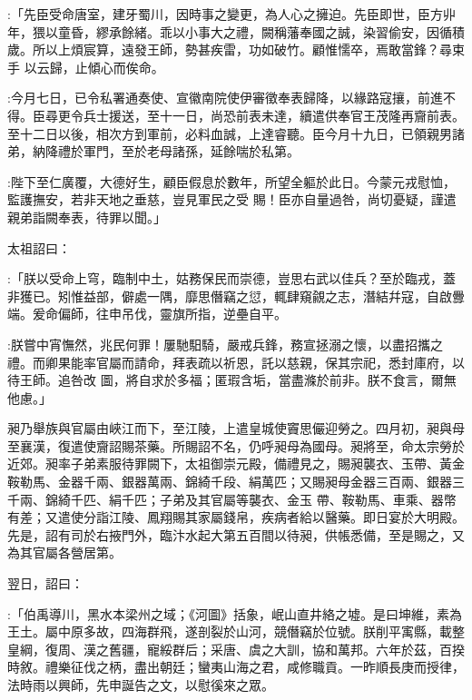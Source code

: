 \begin{pinyinscope}
 :「先臣受命唐室，建牙蜀川，因時事之變更，為人心之擁迫。先臣即世，臣方丱年，猥以童昏，繆承餘緒。乖以小事大之禮，闕稱藩奉國之誠，染習偷安，因循積歲。所以上煩宸算，遠發王師，勢甚疾雷，功如破竹。顧惟懦卒，焉敢當鋒？尋束手
 以云歸，止傾心而俟命。



 :今月七日，已令私署通奏使、宣徽南院使伊審徵奉表歸降，以緣路寇攘，前進不得。臣尋更令兵士援送，至十一日，尚恐前表未達，續遣供奉官王茂隆再齎前表。至十二日以後，相次方到軍前，必料血誠，上達睿聽。臣今月十九日，已領親男諸弟，納降禮於軍門，至於老母諸孫，延餘喘於私第。



 :陛下至仁廣覆，大德好生，顧臣假息於數年，所望全軀於此日。今蒙元戎慰恤，監護撫安，若非天地之垂慈，豈見軍民之受
 賜！臣亦自量過咎，尚切憂疑，謹遣親弟詣闕奉表，待罪以聞。」



 太祖詔曰：



 :「朕以受命上穹，臨制中土，姑務保民而崇德，豈思右武以佳兵？至於臨戎，蓋非獲已。矧惟益部，僻處一隅，靡思僭竊之愆，輒肆窺覦之志，潛結幷寇，自啟釁端。爰命偏師，往申吊伐，靈旗所指，逆壘自平。



 :朕嘗中宵憮然，兆民何罪！屢馳馹騎，嚴戒兵鋒，務宣拯溺之懷，以盡招攜之禮。而卿果能率官屬而請命，拜表疏以祈恩，託以慈親，保其宗祀，悉封庫府，以待王師。追咎改
 圖，將自求於多福；匿瑕含垢，當盡滌於前非。朕不食言，爾無他慮。」



 昶乃舉族與官屬由峽江而下，至江陵，上遣皇城使竇思儼迎勞之。四月初，昶與母至襄漢，復遣使齎詔賜茶藥。所賜詔不名，仍呼昶母為國母。昶將至，命太宗勞於近郊。昶率子弟素服待罪闕下，太祖御崇元殿，備禮見之，賜昶襲衣、玉帶、黃金鞍勒馬、金器千兩、銀器萬兩、錦綺千段、絹萬匹；又賜昶母金器三百兩、銀器三千兩、錦綺千匹、絹千匹；子弟及其官屬等襲衣、金玉
 帶、鞍勒馬、車乘、器幣有差；又遣使分詣江陵、鳳翔賜其家屬錢帛，疾病者給以醫藥。即日宴於大明殿。先是，詔有司於右掖門外，臨汴水起大第五百間以待昶，供帳悉備，至是賜之，又為其官屬各營居第。



 翌日，詔曰：



 :「伯禹導川，黑水本梁州之域；《河圖》括象，岷山直井絡之墟。是曰坤維，素為王土。屬中原多故，四海群飛，遂剖裂於山河，競僭竊於位號。朕削平㝢縣，載整皇綱，復周、漢之舊疆，寵綏群后；采唐、虞之大訓，協和萬邦。六年於茲，百揆
 時敘。禮樂征伐之柄，盡出朝廷；蠻夷山海之君，咸修職貢。一昨順長庚而授律，法時雨以興師，先申誕告之文，以慰徯來之眾。




\end{pinyinscope}
